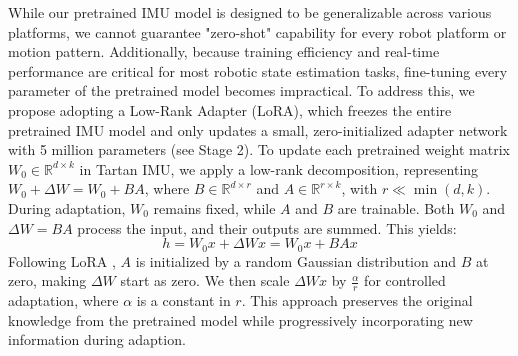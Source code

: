 



While our pretrained IMU model is designed to be generalizable across various platforms, we cannot guarantee "zero-shot" capability for every robot platform or motion pattern. Additionally, because training efficiency and real-time performance are critical for most robotic state estimation tasks, fine-tuning every parameter of the pretrained model becomes impractical. To address this, we propose adopting a Low-Rank Adapter (LoRA)\cite{hu2021lora}, which freezes the entire pretrained IMU model and only updates a small, zero-initialized adapter network with 5 million parameters (see  Stage 2). To update each pretrained weight matrix \( W_0 \in \mathbb{R}^{d \times k} \) in Tartan IMU, we apply a low-rank decomposition, representing \( W_0 + \Delta W = W_0 + BA \), where \( B \in \mathbb{R}^{d \times r} \) and \( A \in \mathbb{R}^{r \times k} \), with \( r \ll \min(d, k) \). During adaptation, \( W_0 \) remains fixed, while \( A \) and \( B \) are trainable. Both \( W_0 \) and \( \Delta W = BA \) process the input, and their outputs are summed. This yields:
\begin{equation}
h = W_0 x + \Delta W x = W_0 x + BA x
\label{eq:lora}
\end{equation}
Following LoRA \cite{hu2021lora}, \( A \) is initialized by a random Gaussian distribution and \( B \) at zero, making \( \Delta W \) start as zero. We then scale \( \Delta W x \) by \( \frac{\alpha}{r} \) for controlled adaptation, where $\alpha$ is a constant in $r$. This approach preserves the original knowledge from the pretrained model while progressively incorporating new information during adaption. 



